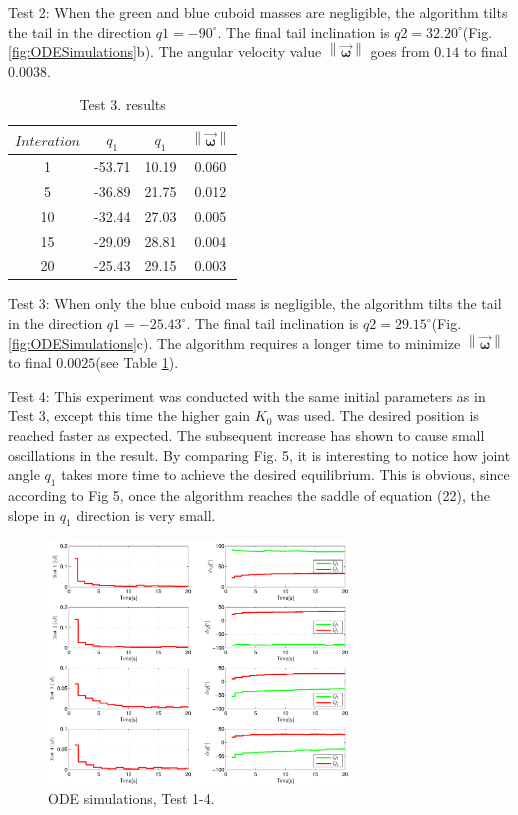 Test 2: When the green and blue cuboid masses are negligible, the algorithm tilts the tail in the direction $q1=-90^{\circ}$. The final tail inclination is $q2=32.20^{\circ}$(Fig. \ref{fig:ODESimulations}b). The angular velocity value $\left \| \vec{\boldsymbol{\omega}} \right \|$ goes from $0.14$ to final $0.0038$. 

\begin{table}[!t]
	\centering
\begin{tabular}{|c|c|c|c|}
	\hline
$Interation$ & $q_1$ & $q_1$  & $\left \| \vec{\boldsymbol{\omega}} \right \|$\\
	\hline
1 & -53.71 & 10.19 & 0.060\\
5 & -36.89 & 21.75 & 0.012\\
10 & -32.44 & 27.03 &  0.005\\
15 & -29.09 & 28.81 & 0.004\\
20 & -25.43 & 29.15 &  0.003\\
\hline
\end{tabular}
\caption{Test 3. results}\label{tab:Simulations2}
\end{table}

Test 3: When only the blue cuboid mass is negligible, the algorithm tilts the tail in the direction $q1=-25.43^{\circ}$. The final tail inclination is $q2=29.15^{\circ}$(Fig. \ref{fig:ODESimulations}c). The algorithm requires a longer time to minimize $\left \| \vec{\boldsymbol{\omega}} \right \|$ to final $0.0025$(see Table \ref{tab:Simulations2}).



Test 4: This experiment was conducted with the same initial parameters as in Test 3, except this time the higher gain $K_0$ was used. The desired position is reached faster as expected. The subsequent increase has shown to cause small oscillations in the result. By comparing Fig. 5, it is interesting to notice how joint angle $q_1$ takes more time to achieve the desired equilibrium. This is obvious, since according to Fig 5, once the algorithm reaches the saddle of equation (22), the slope in $q_1$ direction is very small.


\begin{figure}[!t]
	\centering
	\includegraphics[width=80mm]{./pictures/ODE_graph.pdf}
	\caption{ODE simulations, Test 1-4.}
	\label{fig:ODE graph}
\end{figure}


